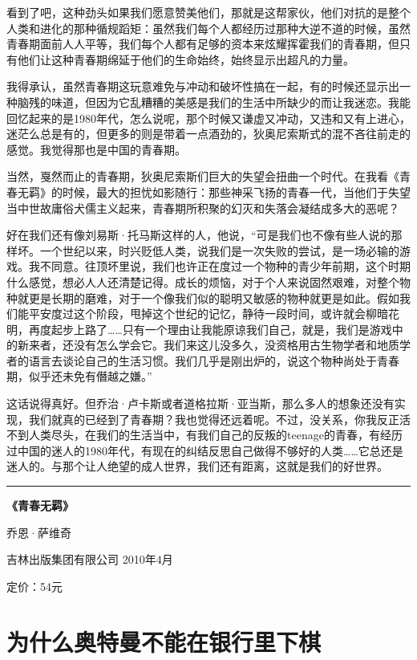 看到了吧，这种劲头如果我们愿意赞美他们，那就是这帮家伙，他们对抗的是整个人类和进化的那种循规蹈矩：虽然我们每个人都经历过那种大逆不道的时候，虽然青春期面前人人平等，我们每个人都有足够的资本来炫耀挥霍我们的青春期，但只有他们让这种青春期绵延于他们的生命始终，始终显示出超凡的力量。

我得承认，虽然青春期这玩意难免与冲动和破坏性搞在一起，有的时候还显示出一种脑残的味道，但因为它乱糟糟的美感是我们的生活中所缺少的而让我迷恋。我能回忆起来的是1980年代，怎么说呢，那个时候又谦虚又冲动，又违和又有上进心，迷茫么总是有的，但更多的则是带着一点酒劲的，狄奥尼索斯式的混不吝往前走的感觉。我觉得那也是中国的青春期。

当然，戛然而止的青春期，狄奥尼索斯们巨大的失望会扭曲一个时代。在我看《青春无羁》的时候，最大的担忧如影随行：那些神采飞扬的青春一代，当他们于失望当中世故庸俗犬儒主义起来，青春期所积聚的幻灭和失落会凝结成多大的恶呢？

好在我们还有像刘易斯·托马斯这样的人，他说，``可是我们也不像有些人说的那样坏。一个世纪以来，时兴贬低人类，说我们是一次失败的尝试，是一场必输的游戏。我不同意。往顶坏里说，我们也许正在度过一个物种的青少年前期，这个时期什么感觉，想必人人还清楚记得。成长的烦恼，对于个人来说固然艰难，对整个物种就更是长期的磨难，对于一个像我们似的聪明又敏感的物种就更是如此。假如我们能平安度过这个阶段，甩掉这个世纪的记忆，静待一段时间，或许就会柳暗花明，再度起步上路了\ldots\ldots 只有一个理由让我能原谅我们自己，就是，我们是游戏中的新来者，还没有怎么学会它。我们来这儿没多久，没资格用古生物学者和地质学者的语言去谈论自己的生活习惯。我们几乎是刚出炉的，说这个物种尚处于青春期，似乎还未免有僭越之嫌。''

这话说得真好。但乔治·卢卡斯或者道格拉斯·亚当斯，那么多人的想象还没有实现，我们就真的已经到了青春期？我也觉得还远着呢。不过，没关系，你我反正活不到人类尽头，在我们的生活当中，有我们自己的反叛的teenage的青春，有经历过中国的迷人的1980年代，有现在的纠结反思自己做得不够好的人类\ldots\ldots 它总还是迷人的。与那个让人绝望的成人世界，我们还有距离，这就是我们的好世界。

\begin{center}\rule{0.5\linewidth}{0.5pt}\end{center}

\textbf{《青春无羁》}

乔恩·萨维奇

吉林出版集团有限公司 2010年4月

定价：54元

\hypertarget{ux4e3aux4ec0ux4e48ux5965ux7279ux66fcux4e0dux80fdux5728ux94f6ux884cux91ccux4e0bux68cb}{%
\section{为什么奥特曼不能在银行里下棋}\label{ux4e3aux4ec0ux4e48ux5965ux7279ux66fcux4e0dux80fdux5728ux94f6ux884cux91ccux4e0bux68cb}}

